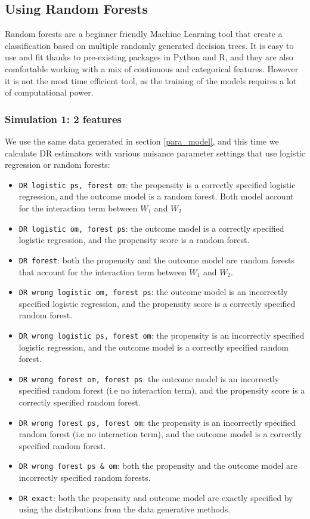 \documentclass[12pt,twoside]{article}
\begin{document}
\subsection{Using Random Forests}

Random forests are a beginner friendly Machine Learning tool that create a classification based on multiple randomly generated decision trees. It is easy to use and fit thanks to pre-existing packages in Python and R, and they are also comfortable working with a mix of continuous and categorical features. However it is not the most time efficient tool, as the training of the models requires a lot of computational power. 

\subsubsection{Simulation 1: 2 features}

We use the same data generated in section \ref{para_model}, and this time we calculate DR estimators with various nuisance parameter settings that use logistic regression or random forests:
\begin{itemize}
    \item \texttt{DR logistic ps, forest om}: the propensity is a correctly specified logistic regression, and the outcome model is a random forest. Both model account for the interaction term between $W_1$ and $W_2$
    \item \texttt{DR logistic om, forest ps}: the outcome model is a correctly specified logistic regression, and the propensity score is a random forest.
    \item \texttt{DR forest}: both the propensity and the outcome model are random forests that account for the interaction term between $W_1$ and $W_2$.
    \item \texttt{DR wrong logistic om, forest ps}: the outcome model is an incorrectly specified logistic regression, and the propensity score is a correctly specified random forest.
    \item \texttt{DR wrong logistic ps, forest om}: the propensity is an incorrectly specified logistic regression, and the outcome model is a correctly specified random forest.
    \item \texttt{DR wrong forest om, forest ps}: the outcome model is an incorrectly specified random forest (i.e no interaction term), and the propensity score is a correctly specified random forest.
    \item \texttt{DR wrong forest ps, forest om}: the propensity is an incorrectly specified random forest (i.e no interaction term), and the outcome model is a correctly specified random forest.
    \item \texttt{DR wrong forest ps \& om}: both the propensity and the outcome model are incorrectly specified random forests.
    \item \texttt{DR exact}: both the propensity and outcome model are exactly specified by using the distributions from the data generative methods.
\end{itemize}
\end{document}
